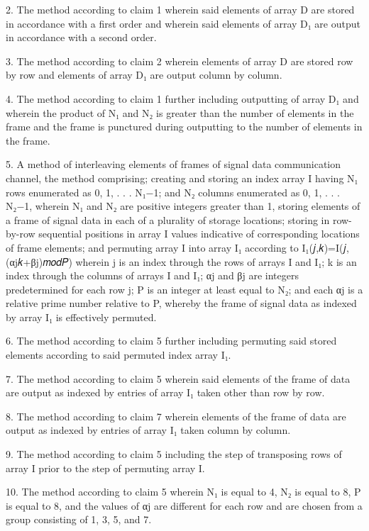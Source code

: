 \documentclass[11pt,a4paper]{article}
\begin{document}
2. The method according to claim 1 wherein said elements of array D are stored in accordance with a first order and wherein said elements of array D₁ are output in accordance with a second order.

3. The method according to claim 2 wherein elements of array D are stored row by row and elements of array D₁ are output column by column.

4. The method according to claim 1 further including outputting of array D₁ and wherein the product of N₁ and N₂ is greater than the number of elements in the frame and the frame is punctured during outputting to the number of elements in the frame.

5. A method of interleaving elements of frames of signal data communication channel, the method comprising; creating and storing an index array I having N₁ rows enumerated as 0, 1, . . . N₁−1; and N₂ columns enumerated as 0, 1, . . . N₂−1, wherein N₁ and N₂ are positive integers greater than 1, storing elements of a frame of signal data in each of a plurality of storage locations; storing in row-by-row sequential positions in array I values indicative of corresponding locations of frame elements; and permuting array I into array I₁ according to I₁(𝑗,𝑘)=I(𝑗,(αj𝑘+βj)𝑚𝑜𝑑𝑃)  wherein j is an index through the rows of arrays I and I₁; k is an index through the columns of arrays I and I₁; αj and βj are integers predetermined for each row j; P is an integer at least equal to N₂; and each αj is a relative prime number relative to P, whereby the frame of signal data as indexed by array I₁ is effectively permuted.

6. The method according to claim 5 further including permuting said stored elements according to said permuted index array I₁.

7. The method according to claim 5 wherein said elements of the frame of data are output as indexed by entries of array I₁ taken other than row by row.

8. The method according to claim 7 wherein elements of the frame of data are output as indexed by entries of array I₁ taken column by column.

9. The method according to claim 5 including the step of transposing rows of array I prior to the step of permuting array I.

10. The method according to claim 5 wherein N₁ is equal to 4, N₂ is equal to 8, P is equal to 8, and the values of αj are different for each row and are chosen from a group consisting of 1, 3, 5, and 7.
\end{document}
